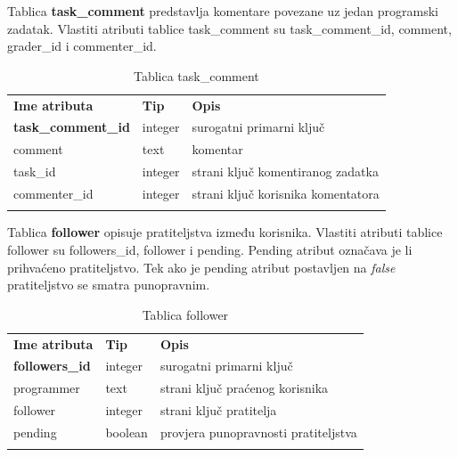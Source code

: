 \documentclass[times, utf8, zavrsni, numeric]{fer}
\begin{document}
		Tablica \textbf{task\_comment} predstavlja komentare povezane uz jedan programski zadatak. Vlastiti atributi tablice task\_comment su task\_comment\_id, comment, grader\_id i commenter\_id. 
		\begin{table}[H]
			\caption{Tablica task\_comment}
			\label{tbl:taskcomment}
			\centering
			\begin{tabu} to \textwidth {XXX}
				\tabucline[1.75pt]{-}
				\textbf{Ime atributa} & \textbf{Tip} & \textbf{Opis}\\ 				
				\tabucline[1.75pt]{-}
				\textbf{task\_comment\_id} & integer & surogatni primarni ključ\\ \hline
				comment & text & komentar\\ \hline
				task\_id & integer & strani ključ komentiranog zadatka\\ \hline
				commenter\_id & integer & strani ključ korisnika komentatora\\ \hline
				\tabucline[1.75pt]{-}
			\end{tabu}
		\end{table}
	
		Tablica \textbf{follower} opisuje pratiteljstva između korisnika. Vlastiti atributi tablice follower su followers\_id, follower i pending. Pending atribut označava je li prihvaćeno pratiteljstvo. Tek ako je pending atribut postavljen na \textit{false} pratiteljstvo se smatra punopravnim.
		\begin{table}[H]
			\caption{Tablica follower}
			\label{tbl:follower}
			\centering
			\begin{tabu} to \textwidth {XXX}
				\tabucline[1.75pt]{-}
				\textbf{Ime atributa} & \textbf{Tip} & \textbf{Opis}\\ 				
				\tabucline[1.75pt]{-}
				\textbf{followers\_id} & integer & surogatni primarni ključ\\ \hline
				programmer & text & strani ključ praćenog korisnika\\ \hline
				follower & integer & strani ključ pratitelja\\ \hline
				pending & boolean & provjera punopravnosti pratiteljstva\\ \hline
				\tabucline[1.75pt]{-}
			\end{tabu}
		\end{table}
		
\end{document}
